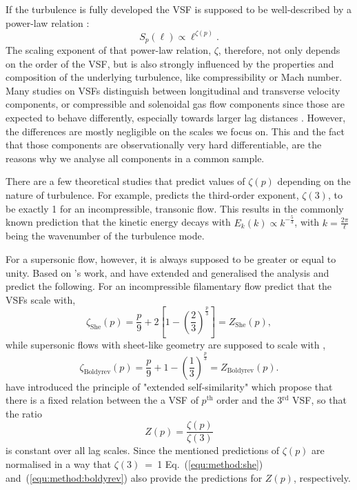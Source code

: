 If the turbulence is fully developed the VSF is supposed to be well-described by a power-law relation \citep{Kolmogorov1941,She1994,Boldyrev2002}:
\begin{equation}
	\mathit{S}_p (\ell) \propto \ell^{\zeta(p)} .
    \label{equ:method:propto_zeta}
\end{equation}
The scaling exponent of that power-law relation, $\zeta$, therefore, not only depends on the order of the VSF, but is also strongly influenced by the properties and composition of the underlying turbulence, like compressibility or Mach number.
Many studies on VSFs  distinguish between longitudinal and transverse velocity components, or compressible and solenoidal gas flow components since those are expected to behave differently, especially towards larger lag distances \citep{Gotoh2002,Schmidt2008,Benzi2010}.
However, the differences are mostly negligible on the scales we focus on. 
This and the fact that those components are observationally very hard differentiable, are the reasons why we analyse all components in a common sample.

There are a few theoretical studies that predict values of $\zeta(p)$ depending on the nature of turbulence.
For example, \citet{Kolmogorov1941} predicts the third-order exponent, $\zeta(3)$, to be exactly 1 for an incompressible, transonic flow.
This results in the commonly known prediction that the kinetic energy decays with $E_k(k) \propto k^{-\frac{5}{3}}$, with $k = \frac{2 \pi}{\ell}$ being the wavenumber of the turbulence mode.

For a supersonic flow, however, it is always supposed to be greater or equal to unity.
Based on \citeauthor{Kolmogorov1941}'s work, \citet{She1994} and \citet{Boldyrev2002} have extended and generalised the analysis and predict the following.
For an incompressible filamentary flow \citet{She1994} predict that the VSFs scale with,
\begin{equation}
	\zeta_\mathrm{She}(p) = \frac{p}{9} + 2 \left[ 1 - \left( \frac{2}{3} \right)^{\frac{p}{3}} \right] = Z_\mathrm{She}(p) ,
    \label{equ:method:she}
\end{equation}
while supersonic flows with sheet-like geometry are supposed to scale with \citep{Boldyrev2002},
\begin{equation}
	 \zeta_\mathrm{Boldyrev}(p) = \frac{p}{9} + 1 - \left( \frac{1}{3} \right)^{\frac{p}{3}} = Z_\mathrm{Boldyrev}(p) .
    \label{equ:method:boldyrev}
\end{equation}
\citet{Benzi1993} have introduced the principle of "extended self-similarity" which propose that there is a fixed relation between the a VSF of $p^\mathrm{th}$ order and the 3$^\mathrm{rd}$ VSF, so that the ratio 
\begin{equation}
	Z(p) = \frac{\zeta(p)}{\zeta(3)}
	\label{equ:method:z_def}
\end{equation} 
is constant over all lag scales.
Since the mentioned predictions of $\zeta(p)$ are normalised in a way that $\zeta(3)$~=~1 Eq.~(\ref{equ:method:she}) and~(\ref{equ:method:boldyrev}) also provide the predictions for $Z(p)$, respectively.

